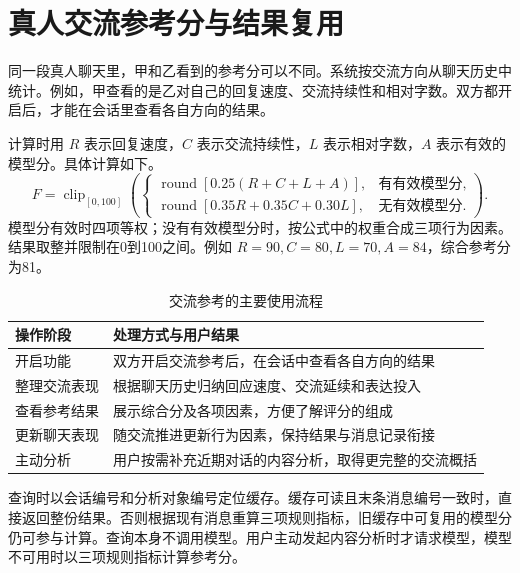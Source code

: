 \clearpage
\section{真人交流参考分与结果复用}
\label{sec:design-favorability}
同一段真人聊天里，甲和乙看到的参考分可以不同。系统按交流方向从聊天历史中统计。例如，甲查看的是乙对自己的回复速度、交流持续性和相对字数。双方都开启后，才能在会话里查看各自方向的结果。

计算时用 $R$ 表示回复速度，$C$ 表示交流持续性，$L$ 表示相对字数，$A$ 表示有效的模型分。具体计算如下。
\begin{equation}
F=\operatorname{clip}_{[0,100]}\left(\begin{cases}
\operatorname{round}[0.25(R+C+L+A)],&\text{有有效模型分},\\
\operatorname{round}[0.35R+0.35C+0.30L],&\text{无有效模型分}.
\end{cases}\right).\label{eq:design-favorability}
\end{equation}
模型分有效时四项等权；没有有效模型分时，按公式中的权重合成三项行为因素。结果取整并限制在0到100之间。例如 $R=90,C=80,L=70,A=84$，综合参考分为81。

\begin{table}[H]
\centering\small
\caption{交流参考的主要使用流程}\label{tab:design-favorability-cache}
\begin{tabularx}{\linewidth}{@{}p{32mm}X@{}}
\toprule 操作阶段 & 处理方式与用户结果 \\ \midrule
开启功能 & 双方开启交流参考后，在会话中查看各自方向的结果 \\
整理交流表现 & 根据聊天历史归纳回应速度、交流延续和表达投入 \\
查看参考结果 & 展示综合分及各项因素，方便了解评分的组成 \\
更新聊天表现 & 随交流推进更新行为因素，保持结果与消息记录衔接 \\
主动分析 & 用户按需补充近期对话的内容分析，取得更完整的交流概括 \\
\bottomrule
\end{tabularx}
\end{table}

查询时以会话编号和分析对象编号定位缓存。缓存可读且末条消息编号一致时，直接返回整份结果。否则根据现有消息重算三项规则指标，旧缓存中可复用的模型分仍可参与计算。查询本身不调用模型。用户主动发起内容分析时才请求模型，模型不可用时以三项规则指标计算参考分。

